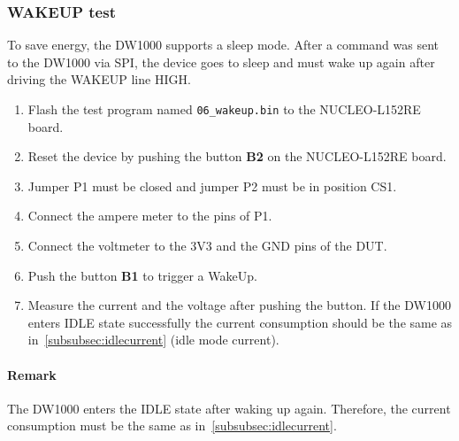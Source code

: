 \documentclass[journal,comsoc]{IEEEtran}
\begin{document}
\subsubsection{WAKEUP test}
To save energy, the DW1000 supports a sleep mode. After a command was sent to the DW1000 via SPI, the device goes to sleep and must wake up again after driving the WAKEUP line HIGH.
\begin{enumerate}
	\item Flash the test program named \texttt{06\_wakeup.bin} to the NUCLEO-L152RE board.
	\item Reset the device by pushing the button \textbf{B2} on the NUCLEO-L152RE board. %
	\item Jumper P1 must be closed and jumper P2 must be in position CS1. %
	\item Connect the ampere meter to the pins of P1.
	\item Connect the voltmeter to the 3V3 and the GND pins of the DUT.
	\item Push the button \textbf{B1} to trigger a WakeUp.
	\item Measure the current and the voltage after pushing the button. If the DW1000 enters IDLE state successfully the current consumption should be the same as in~\ref{subsubsec:idlecurrent} (idle mode current).
\end{enumerate}
\paragraph{Remark}
The DW1000 enters the IDLE state after waking up again. Therefore, the current consumption must be the same as in~\ref{subsubsec:idlecurrent}. \\
\end{document}
